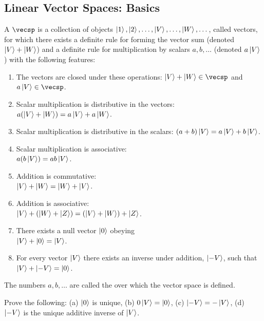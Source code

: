 \subsection{Linear Vector Spaces: Basics}

\begin{shaded*}
A  $\vecsp$ is a collection of objects $\ket{1}, \ket{2}, \ldots, \ket{V}, \ldots, \ket{W}, \ldots\,$, called vectors, for which there exists a definite rule for forming the vector sum (denoted $\ket{V} + \ket{W}$) and a definite rule for multiplication by scalars $a, b, \ldots$ (denoted $a\ket{V}$) with the following features:
    \begin{enumerate}
        \item The vectors are closed under these operations: $\ket{V} + \ket{W} \in \vecsp$ and $a\ket{V} \in \vecsp$.
        \item Scalar multiplication is distributive in the vectors: $a(\ket{V} + \ket{W}) = a\ket{V} + a\ket{W}$.
        \item Scalar multiplication is distributive in the scalars: $(a + b)\ket{V} = a\ket{V} + b\ket{V}$.
        \item Scalar multiplication is associative: \\$a(b\ket{V}) = ab\ket{V}$.
        \item Addition is commutative: \\$\ket{V} + \ket{W} = \ket{W} + \ket{V}$.
        \item Addition is associative: \\$\ket{V} + (\ket{W} + \ket{Z}) = (\ket{V} + \ket{W}) + \ket{Z}$.
        \item There exists a null vector $\ket{0}$ obeying \\$\ket{V} + \ket{0} = \ket{V}$.
        \item For every vector $\ket{V}$ there exists an inverse under addition, $\ket{-V}$, such that \\$\ket{V} + \ket{-V} = \ket{0}$.
    \end{enumerate}
\end{shaded*}


The numbers $a, b, \ldots$ are called the  over which the vector space is defined.

\begin{exercise}
Prove the following: (a) $\ket{0}$ is unique, (b) $0\ket{V} = \ket{0}$, (c) $\ket{-V} = -\ket{V}$, (d) $\ket{-V}$ is the unique additive inverse of $\ket{V}$.
\end{exercise}

